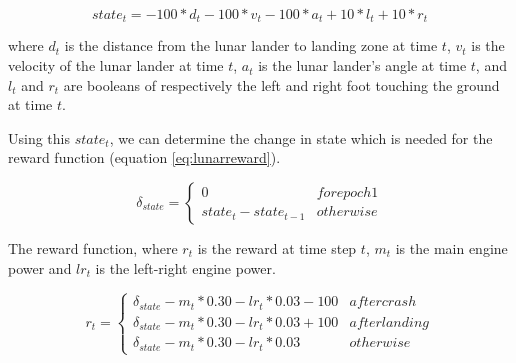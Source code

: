 \begin{equation} 
    state_t = -100 * d_t - 100 * v_t - 100 * a_t + 10*l_t + 10*r_t
\end{equation}

where $d_t$ is the distance from the lunar lander to landing zone at time $t$, $v_t$ is the velocity of the lunar lander at time $t$, $a_t$ is the lunar lander's angle at time $t$, and $l_t$ and $r_t$ are booleans of respectively the left and right foot touching the ground at time $t$.  

Using this $state_t$, we can determine the change in state which is needed for the reward function (equation \ref{eq:lunarreward}). 

\begin{equation}
    \delta _{state} =
    \begin{cases*}
      0  & for epoch 1 \\
      state _t - state _{t-1} & otherwise 
    \end{cases*}
\end{equation}

The reward function, where $r_t$ is the reward at time step $t$, $m_t$ is the main engine power and $lr_t$ is the left-right engine power.

\begin{equation}
\label{eq:lunarreward}
    r_t =
    \begin{cases*}
      \delta _{state} - m_t*0.30 - lr_t*0.03 -100  & after crash \\
      \delta _{state} - m_t*0.30 - lr_t*0.03 +100 & after landing \\
      \delta _{state} - m_t*0.30 - lr_t*0.03  & otherwise 
    \end{cases*}
\end{equation}
